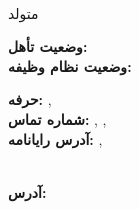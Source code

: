 \documentclass{./../lib/curriculumVitae}
\begin{document}
\iftoggle{Dev}{\par}{}
\parbox{36mm}
{\parbox{36mm}{\raggedleft\Huge\bfseries\color{cyan}\fullName}\\\parbox{36mm}{\centering متولد \bornData}}\quad\parbox{39mm}
{\textbf{وضعیت تأهل:} \maritalState\\\textbf{وضعیت نظام وظیفه:} \militaryService}\quad\parbox{99mm}
{\textbf{حرفه:} \ProfessionI, \ProfessionII\\\textbf{شماره تماس:} \mobilePhoneI, \mobilePhoneII, \phoneNumber\\\textbf{آدرس رایانامه:} \emailI, \emailII}\\
\textbf{آدرس:} \fullAddress\\

\descriptions

\education

\workExperience

\teaching

\project

\publication

\LicensesCertifications

\honorsAwards

\training

\languageS

\craft

\voluntary
\end{document}
